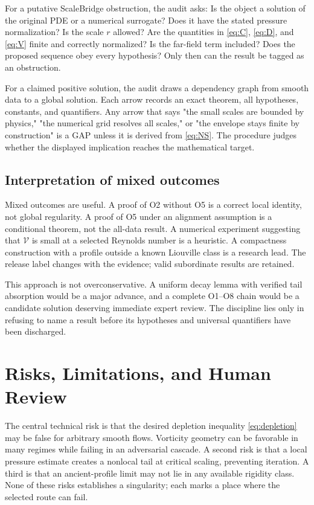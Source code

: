 \documentclass[conference]{../../../../Conference-LaTeX-template_10-17-19/IEEEtran}
\begin{document}
For a putative ScaleBridge obstruction, the audit asks: Is the object a solution of the original PDE or a numerical surrogate? Does it have the stated pressure normalization? Is the scale $r$ allowed? Are the quantities in \eqref{eq:C}, \eqref{eq:D}, and \eqref{eq:V} finite and correctly normalized? Is the far-field term included? Does the proposed sequence obey every hypothesis? Only then can the result be tagged as an obstruction.

For a claimed positive solution, the audit draws a dependency graph from smooth data to a global solution. Each arrow records an exact theorem, all hypotheses, constants, and quantifiers. Any arrow that says "the small scales are bounded by physics," "the numerical grid resolves all scales," or "the envelope stays finite by construction" is a GAP unless it is derived from \eqref{eq:NS}. The procedure judges whether the displayed implication reaches the mathematical target.

\subsection{Interpretation of mixed outcomes}
Mixed outcomes are useful. A proof of O2 without O5 is a correct local identity, not global regularity. A proof of O5 under an alignment assumption is a conditional theorem, not the all-data result. A numerical experiment suggesting that $\mathcal V$ is small at a selected Reynolds number is a heuristic. A compactness construction with a profile outside a known Liouville class is a research lead. The release label changes with the evidence; valid subordinate results are retained.

This approach is not overconservative. A uniform decay lemma with verified tail absorption would be a major advance, and a complete O1--O8 chain would be a candidate solution deserving immediate expert review. The discipline lies only in refusing to name a result before its hypotheses and universal quantifiers have been discharged.

\section{Risks, Limitations, and Human Review}
The central technical risk is that the desired depletion inequality \eqref{eq:depletion} may be false for arbitrary smooth flows. Vorticity geometry can be favorable in many regimes while failing in an adversarial cascade. A second risk is that a local pressure estimate creates a nonlocal tail at critical scaling, preventing iteration. A third is that an ancient-profile limit may not lie in any available rigidity class. None of these risks establishes a singularity; each marks a place where the selected route can fail.
\end{document}

